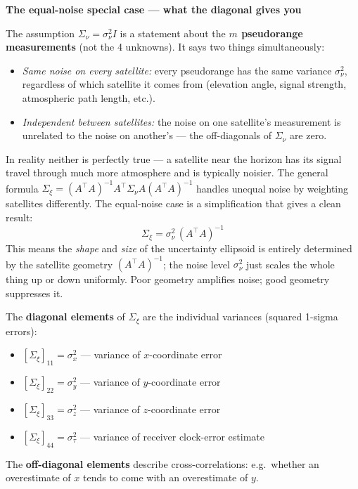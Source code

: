 \documentclass[12pt, a4paper]{article}
\begin{document}
\begin{notebox}
  \textbf{The equal-noise special case --- what the diagonal gives you}

  The assumption $\Sigma_\nu = \sigma_\nu^2 I$ is a statement about the
  \textbf{$m$ pseudorange measurements} (not the 4 unknowns).
  It says two things simultaneously:
  \begin{itemize}[leftmargin=1.5em, itemsep=1pt]
    \item \emph{Same noise on every satellite:} every pseudorange has the
      same variance $\sigma_\nu^2$, regardless of which satellite it comes
      from (elevation angle, signal strength, atmospheric path length,
      etc.).
    \item \emph{Independent between satellites:} the noise on one
      satellite's measurement is unrelated to the noise on another's ---
      the off-diagonals of $\Sigma_\nu$ are zero.
  \end{itemize}
  In reality neither is perfectly true --- a satellite near the horizon
  has its signal travel through much more atmosphere and is typically
  noisier.
  The general formula $\Sigma_\xi = (A^\top A)^{-1}A^\top\Sigma_\nu A
  (A^\top A)^{-1}$ handles unequal noise by weighting satellites
  differently.
  The equal-noise case is a simplification that gives a clean result:
  \[
    \Sigma_\xi = \sigma_\nu^2\,(A^\top A)^{-1}
  \]
  This means the \emph{shape} and \emph{size} of the uncertainty ellipsoid
  is entirely determined by the satellite geometry $(A^\top A)^{-1}$;
  the noise level $\sigma_\nu^2$ just scales the whole thing up or down
  uniformly.
  Poor geometry amplifies noise; good geometry suppresses it.

  The \textbf{diagonal elements} of $\Sigma_\xi$ are the individual
  variances (squared 1-sigma errors):
  \begin{itemize}[leftmargin=1.5em, itemsep=1pt]
    \item $[\Sigma_\xi]_{11} = \sigma_x^2$ --- variance of $x$-coordinate
      error
    \item $[\Sigma_\xi]_{22} = \sigma_y^2$ --- variance of $y$-coordinate
      error
    \item $[\Sigma_\xi]_{33} = \sigma_z^2$ --- variance of $z$-coordinate
      error
    \item $[\Sigma_\xi]_{44} = \sigma_\tau^2$ --- variance of receiver
      clock-error estimate
  \end{itemize}
  The \textbf{off-diagonal elements} describe cross-correlations: e.g.\
  whether an overestimate of $x$ tends to come with an overestimate of $y$.
\end{notebox}
\end{document}
